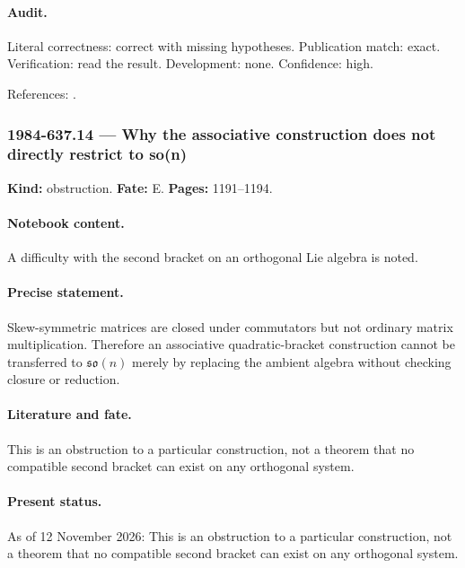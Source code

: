 \paragraph{Audit.} Literal correctness: correct with missing hypotheses. Publication match: exact. Verification: read the result. Development: none. Confidence: high.

\noindent References: \citep{semenov1983classical}.\par

\subsubsection{1984-637.14 --- Why the associative construction does not directly restrict to so(n)}

\label{item:1984-637.14}

\noindent\textbf{Kind:} obstruction. \textbf{Fate:} E. \textbf{Pages:} 1191--1194.\par

\paragraph{Notebook content.} A difficulty with the second bracket on an orthogonal Lie algebra is noted.

\paragraph{Precise statement.} Skew-symmetric matrices are closed under commutators but not ordinary matrix multiplication. Therefore an associative quadratic-bracket construction cannot be transferred to \(\mathfrak{so}(n)\) merely by replacing the ambient algebra without checking closure or reduction.

\paragraph{Literature and fate.} This is an obstruction to a particular construction, not a theorem that no compatible second bracket can exist on any orthogonal system.

\paragraph{Present status.} As of 12 November 2026: This is an obstruction to a particular construction, not a theorem that no compatible second bracket can exist on any orthogonal system.

